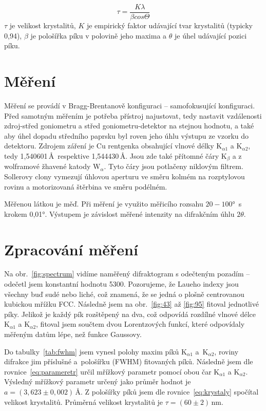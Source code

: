 \documentclass[a4paper,12pt]{article}
\begin{document}
\begin{equation}
	\tau = \dfrac{K\lambda}{\beta cos\Theta}
	\label{eq:krystaly}
\end{equation}
$\tau$ je velikost krystalitů, $K$ je empirický faktor udávající tvar 
krystalitů (typicky 0,94), $\beta$ je pološířka píku v polovině jeho maxima a 
$\theta$ je úhel udávající pozici píku.

\section{Měření}\noindent
Měření se provádí v Bragg-Brentanově konfiguraci -- samofokusující 
konfiguraci. Před samotným měřením je potřeba přístroj najustovat, tedy 
nastavit 
vzdálenosti zdroj-střed goniometru a střed goniometru-detektor na stejnou 
hodnotu, a také aby úhel dopadu středního paprsku byl roven jeho úhlu výstupu 
ze vzorku do detektoru. Zdrojem záření je Cu rentgenka obsahující vlnové délky 
K$_{\alpha1}$ a K$_{\alpha2}$, tedy 1,540601\,\AA\ respektive 1,544430\,\AA. 
Jsou zde také přítomné čáry K$_{\beta}$ a z wolframové žhavené 
katody W$_\alpha$. Tyto čáry jsou potlačeny niklovým filtrem. 
Sollerovy clony vymezují úhlovou aperturu ve směru kolmém na rozptylovou rovinu 
a motorizovaná štěrbina ve směru podélném.

Měřenou látkou je měď. Při měření je využito měřicího rozsahu 
$20 - 100$°~s krokem 0,01°. Výstupem je závislost měřené intenzity na 
difrakčním úhlu $2\theta$.

\section{Zpracování měření}\noindent
Na obr.~\ref{fig:spectrum} vidíme naměřený difraktogram s odečteným 
pozadím -- odečetl jsem konstantní hodnotu 5300. Pozorujeme, že Laueho indexy 
jsou všechny buď sudé nebo liché, což znamená, že se jedná o plošně centrovanou 
kubickou mřížku FCC. Následně jsem na obr.~\ref{fig:43} až \ref{fig:95} fitoval 
jednotlivé 
píky. Jelikož je každý pík rozštěpený na dva, což odpovídá rozdílné vlnové 
délce K$_{\alpha1}$ a K$_{\alpha2}$, fitoval jsem součtem dvou Lorentzových 
funkcí, které odpovídaly měřeným datům lépe, než funkce Gaussovy.

Do tabulky~\ref{tab:fwhm} jsem vynesl polohy maxim píků K$_{\alpha1}$ 
a~K$_{\alpha2}$, roviny difrakce jim příslušné a~pološířku (FWHM) fitovaných 
píků.
Následně jsem dle rovnice~\eqref{eq:parameretr} určil mřížkový parametr pomocí 
obou čar K$_{\alpha1}$ a K$_{\alpha2}$. Výsledný mřížkový parametr určený jako 
průměr hodnot je $a = (3,623\pm0,002)\,\si{\angstrom}$. Z pološířky píků jsem 
dle rovnice~\eqref{eq:krystaly} spočítal velikost krystalitů. Průměrná velikost 
krystalitů je $\tau = (60 \pm 2)\,\si{\nano\meter}$. 
\end{document}
